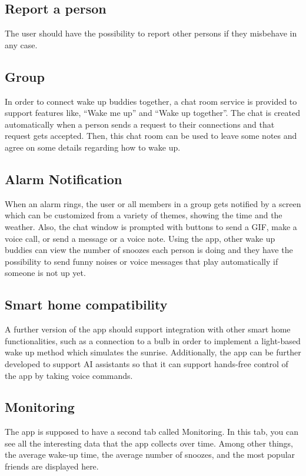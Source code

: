 \documentclass[conference]{IEEEtran}
\begin{document}
\subsection{Report a person}
The user should have the possibility to report other persons if they misbehave in any case.

\subsection{Group}
In order to connect wake up buddies together, a chat room service is provided to support features like, “Wake me up” and “Wake up together”. The chat is created automatically when a person sends a request to their connections and that request gets accepted. Then, this chat room can be used to leave some notes and agree on some details regarding how to wake up.

\subsection{Alarm Notification}
When an alarm rings, the user or all members in a group gets notified by a screen which can be customized from a variety of themes, showing the time and the weather. Also, the chat window is prompted with buttons to send a GIF, make a voice call, or send a message or a voice note. Using the app, other wake up buddies can view the number of snoozes each person is doing and they have the possibility to send funny noises or voice messages that play automatically if someone is not up yet. 

\subsection{Smart home compatibility}
A further version of the app should support integration with other smart home functionalities, such as a connection to a bulb in order to implement a light-based wake up method which simulates the sunrise. Additionally, the app can be further developed to support AI assistants so that it can support hands-free control of the app by taking voice commands. 

\subsection{Monitoring}
The app is supposed to have a second tab called Monitoring. In this tab, you can see all the interesting data that the app collects over time. Among other things, the average wake-up time, the average number of snoozes, and the most popular friends are displayed here. 
\end{document}
